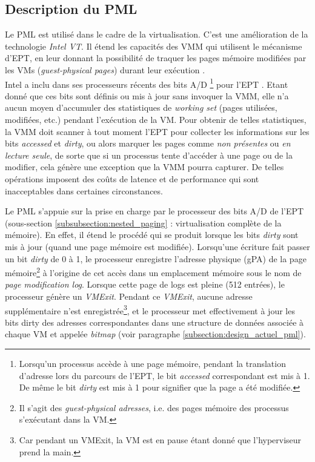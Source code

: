 \subsection{Description du PML}
\label{subsubsection:description_pml}
Le \acs{PML} est utilisé dans le cadre de la virtualisation. C'est une amélioration de la technologie \textit{\ac{Intel VT}}. Il étend les capacités des VMM qui utilisent le mécanisme d'\acs{EPT}, en leur donnant la possibilité de traquer les pages mémoire modifiées par les \acs{VMs} (\textit{guest-physical pages}) durant leur exécution \cite{online5}.\\
Intel a inclu dans ses processeurs récents des bits \ac{A/D} \footnote{Lorsqu'un processus accède à une page mémoire, pendant la translation d'adresse lors du parcours de l'EPT, le bit \textit{accessed} correspondant est mis à 1. De même le bit \textit{dirty} est mis à 1 pour signifier que la page a été modifiée.} pour l'\acs{EPT} \cite{book3}. Etant donné que ces bits sont définis ou mis à jour sans invoquer la VMM, elle n'a aucun moyen d'accumuler des statistiques de \textit{working set} (pages utilisées, modifiées, etc.) pendant l'exécution de la VM. Pour obtenir de telles statistiques, la VMM doit scanner à tout moment l'EPT pour collecter les informations sur les bits \textit{accessed} et \textit{dirty}, ou alors marquer les pages comme \textit{non présentes} ou \emph{en lecture seule}, de sorte que si un processus tente d'accéder à une page ou de la modifier, cela génère une exception que la VMM pourra capturer. De telles opérations imposent des coûts de latence et de performance qui sont inacceptables dans certaines circonstances.

\noindent Le PML s'appuie sur la prise en charge par le processeur des bits \acs{A/D} de l'\acs{EPT} (sous-section \ref{subsubsection:nested_paging} : virtualisation complète de la mémoire). En effet, il étend le procédé qui se produit lorsque les bits \textit{dirty} sont mis à jour (quand une page mémoire est modifiée). Lorsqu'une écriture fait passer un bit \textit{dirty} de 0 à 1, le processeur enregistre l'adresse physique (\acs{gPA}) de la page mémoire\footnote{Il s'agit des \textit{guest-physical adresses}, i.e. des pages mémoire des processus s'exécutant dans la VM.} à l'origine de cet accès dans un emplacement mémoire sous le nom de \textit{page modification log}. Lorsque cette page de logs est pleine (512 entrées), le processeur génère un \textit{VMExit}. Pendant ce \textit{VMExit}, aucune adresse supplémentaire n'est enregistrée\footnote{Car pendant un VMExit, la VM est en pause étant donné que l'hyperviseur prend la main.}, et le processeur met effectivement à jour les bits dirty des adresses correspondantes dans une structure de données associée à chaque VM et appelée \emph{bitmap} (voir paragraphe \ref{subsection:design_actuel_pml}).\\

